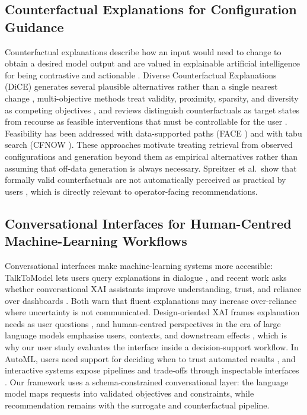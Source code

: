 \documentclass[final,5p,times,twocolumn]{elsarticle}
\begin{document}
\subsection{Counterfactual Explanations for Configuration Guidance}
\label{subsec:rw-cf}

Counterfactual explanations describe how an input would need to change
to obtain a desired model output \cite{wachter_counterfactual_2017} and
are valued in explainable artificial intelligence for being contrastive
and actionable \cite{verma_counterfactual_2024}. Diverse Counterfactual
Explanations (DiCE) generates several plausible alternatives rather than
a single nearest change \cite{10.1145/3351095.3372850}, multi-objective
methods treat validity, proximity, sparsity, and diversity as competing
objectives \cite{dandl_multiobjective_2020}, and reviews distinguish
counterfactuals as target states from recourse as feasible
interventions \cite{karimi_algorithmic_2021} that must be controllable
for the user \cite{ustun_actionable_2019}. Feasibility has been
addressed with data-supported paths (FACE \cite{poyiadzi_face_2020}) and
with tabu search (CFNOW \cite{DEOLIVEIRA2023}). These approaches motivate treating retrieval from observed configurations and generation
beyond them as empirical alternatives rather than assuming that
off-data generation is always necessary. Spreitzer et al.\ show that
formally valid counterfactuals are not automatically perceived as
practical by users \cite{spreitzer_evaluating_2022}, which is directly
relevant to operator-facing recommendations.



\subsection{Conversational Interfaces for Human-Centred Machine-Learning Workflows}
\label{subsec:rw-llm-human}

Conversational interfaces make machine-learning systems more
accessible: TalkToModel lets users query explanations in dialogue
\cite{slack_explaining_2023}, and recent work asks whether
conversational XAI assistants improve understanding, trust, and
reliance over dashboards \cite{he_is_2025}. Both warn that fluent
explanations may increase over-reliance where uncertainty is not
communicated. Design-oriented XAI frames explanation needs as user
questions \cite{liao_questioning_2020}, and human-centred perspectives
in the era of large language models emphasise users, contexts, and
downstream effects \cite{ehsan_human-centered_2024,reinhard_effects_2026},
which is why our user study evaluates the interface inside a
decision-support workflow. In AutoML, users need support for deciding
when to trust automated results \cite{drozdal2020trust,wang_autods_2021},
and interactive systems expose pipelines and trade-offs through
inspectable interfaces
\cite{zoller_xautoml_2023,10.1007/978-3-031-48232-8_42}. Our framework
uses a schema-constrained conversational layer: the language model maps
requests into validated objectives and constraints, while
recommendation remains with the surrogate and counterfactual pipeline.
\end{document}
